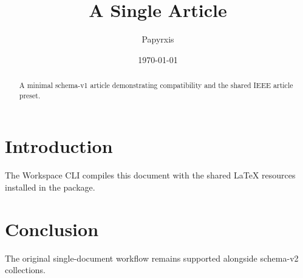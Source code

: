 \documentclass[11pt]{article}
\title{A Single Article}
\author{Papyrxis}
\date{\today}
\begin{document}
\maketitle

\begin{abstract}
A minimal schema-v1 article demonstrating compatibility and the shared IEEE article preset.
\end{abstract}

\section{Introduction}
The Workspace CLI compiles this document with the shared LaTeX resources installed in the package.

\section{Conclusion}
The original single-document workflow remains supported alongside schema-v2 collections.
\end{document}
